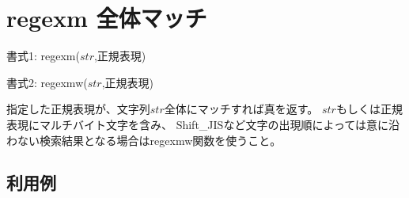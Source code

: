 
%

\section{regexm 全体マッチ\label{sect:regexm}}

書式1: regexm($str$,正規表現)

書式2: regexmw($str$,正規表現)

指定した正規表現が、文字列$str$全体にマッチすれば真を返す。
$str$もしくは正規表現にマルチバイト文字を含み、
Shift\_JISなど文字の出現順によっては意に沿わない検索結果となる場合はregexmw関数を使うこと。

\subsection*{利用例}


%

